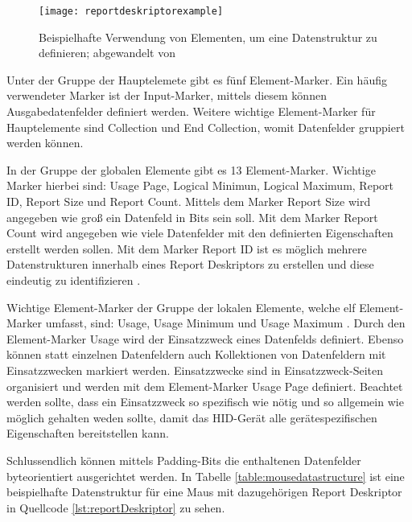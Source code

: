 \begin{figure}[h]
    \centering
    \texttt{[image: reportdeskriptorexample]}
    \caption{Beispielhafte Verwendung von Elementen, um eine Datenstruktur zu definieren; abgewandelt von \cite[S.~24]{usbHIDS}}
    \label{fig:reportdeskriptorexample}
\end{figure}

Unter der Gruppe der Hauptelemete gibt es fünf Element-Marker. Ein häufig verwendeter Marker ist der Input-Marker, mittels diesem können Ausgabedatenfelder definiert werden. Weitere wichtige Element-Marker für Hauptelemente sind Collection und End Collection, womit Datenfelder gruppiert werden können. \cite[S.~23f., S.~30ff.]{usbHIDS}

In der Gruppe der globalen Elemente gibt es 13 Element-Marker. Wichtige Marker hierbei sind: Usage Page, Logical Minimun, Logical Maximum, Report ID, Report Size und Report Count. Mittels dem Marker Report Size wird angegeben wie groß ein Datenfeld in Bits sein soll. Mit dem Marker Report Count wird angegeben wie viele Datenfelder mit den definierten Eigenschaften erstellt werden sollen. Mit dem Marker Report ID ist es möglich mehrere Datenstrukturen innerhalb eines Report Deskriptors zu erstellen und diese eindeutig zu identifizieren \cite[S.~17]{usbHIDS}. \cite[S.~35ff.]{usbHIDS}

Wichtige Element-Marker der Gruppe der lokalen Elemente, welche elf Element-Marker umfasst, sind: Usage, Usage Minimum und Usage Maximum \cite[S.~40]{usbHIDS}. Durch den Element-Marker Usage wird der Einsatzzweck eines Datenfelds definiert. Ebenso können statt einzelnen Datenfeldern auch Kollektionen von Datenfeldern mit Einsatzzwecken markiert werden. Einsatzzwecke sind in Einsatzzweck-Seiten organisiert und werden mit dem Element-Marker Usage Page definiert. Beachtet werden sollte, dass ein Einsatzzweck so spezifisch wie nötig und so allgemein wie möglich gehalten weden sollte, damit das \acs{HID}-Gerät alle gerätespezifischen Eigenschaften bereitstellen kann. \cite[S.~15f.]{usbHIDt}

Schlussendlich können mittels Padding-Bits die enthaltenen Datenfelder byteorientiert ausgerichtet werden. In Tabelle \ref{table:mousedatastructure} ist eine beispielhafte Datenstruktur für eine Maus mit dazugehörigen Report Deskriptor in Quellcode \ref{lst:reportDeskriptor} zu sehen.

